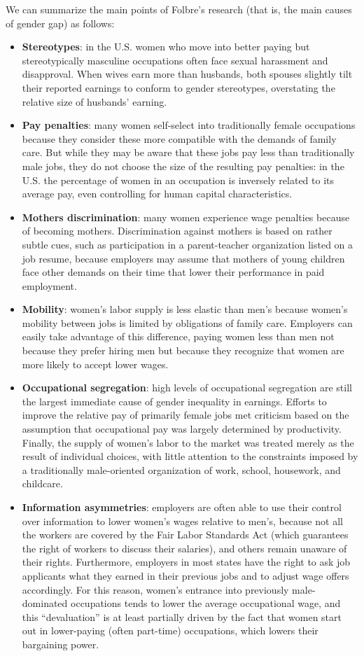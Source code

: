 We can summarize the main points of Folbre's research (that is, the main causes of gender gap) as follows:
\begin{itemize}
\item \textbf{Stereotypes}: in the U.S. women who move into better paying but stereotypically masculine occupations often face sexual harassment and disapproval. When wives earn more than husbands, both spouses slightly tilt their reported earnings to conform to gender stereotypes, overstating the relative size of husbands' earning.
\item \textbf{Pay penalties}: many women self-select into traditionally female occupations because they consider these more compatible with the demands of family care. But while they may be aware that these jobs pay less than traditionally male jobs, they do not choose the size of the resulting pay penalties: in the U.S. the percentage of women in an occupation is inversely related to its average pay, even controlling for human capital characteristics.
\item \textbf{Mothers discrimination}: many women experience wage penalties because of becoming mothers. Discrimination against mothers is based on rather subtle cues, such as participation in a parent-teacher organization listed on a job resume, because employers may assume that mothers of young children face other demands on their time that lower their performance in paid employment.
\item \textbf{Mobility}: women's labor supply is less elastic than men's because women's mobility between jobs is limited by obligations of family care. Employers can easily take advantage of this difference, paying women less than men not because they prefer hiring men but because they recognize that women are more likely to accept lower wages.
\item \textbf{Occupational segregation}: high levels of occupational segregation are still the largest immediate cause of gender inequality in earnings. Efforts to improve the relative pay of primarily female jobs met criticism based on the assumption that occupational pay was largely determined by productivity. Finally, the supply of women's labor to the market was treated merely as the result of individual choices, with little attention to the constraints imposed by a traditionally male-oriented organization of work, school, housework, and childcare.
\item \textbf{Information asymmetries}: employers are often able to use their control over information to lower women's wages relative to men's, because not all the workers are covered by the Fair Labor Standards Act (which guarantees the right of workers to discuss their salaries), and others remain unaware of their rights. Furthermore, employers in most states have the right to ask job applicants what they earned in their previous jobs and to adjust wage offers accordingly. For this reason, women's entrance into previously male-dominated occupations tends to lower the average occupational wage, and this ``devaluation'' is at least partially driven by the fact that women start out in lower-paying (often part-time) occupations, which lowers their bargaining power.

\end{itemize}
